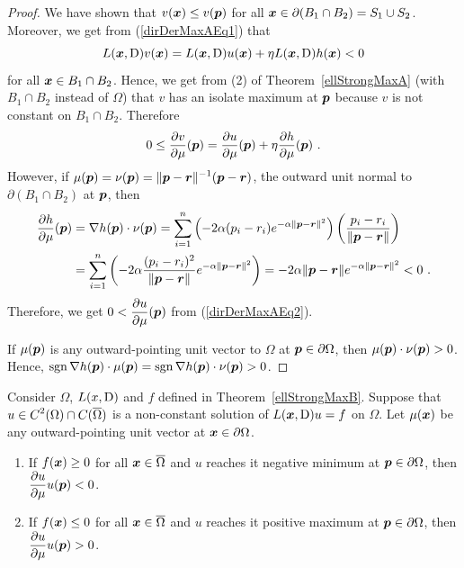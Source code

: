 \begin{proof}
We have shown that $v({\bm{x}}) \leq v({\bm{p}})$ 
for all ${\bm{x}} \in \partial (B_1 \cap B_2) = S_1 \cup S_2$.
Moreover, we get from (\ref{dirDerMaxAEq1}) that
\[
  L({\bm{x}},\operatorname{D}) v ({\bm{x}}) = L({\bm{x}},\operatorname{D}) u({\bm{x}})
  + \eta L({\bm{x}},\operatorname{D}) h({\bm{x}}) < 0
\]
for all ${\bm{x}} \in B_1 \cap B_2$.  Hence, we get
from (2) of Theorem~\ref{ellStrongMaxA} (with $B_1 \cap B_2$ instead
of $\Omega$) that $v$ has an isolate maximum at ${\bm{p}}$ because $v$
is not constant on $B_1 \cap B_2$.  Therefore
\begin{equation} \label{dirDerMaxAEq2}
0 \leq \frac{\partial{v}}{\partial \mu}({\bm{p}}) 
= \frac{\partial{u}}{\partial \mu}({\bm{p}}) + \eta \frac{\partial{h}}{\partial \mu}({\bm{p}}) \ .
\end{equation}
However, if
$\displaystyle \mu({\bm{p}}) = \nu({\bm{p}})
= \|{\bm{p}}-{\bm{r}}\|^{-1} ({\bm{p}} - {\bm{r}})$,
the outward unit normal to $\partial (B_1 \cap B_2)$ at ${\bm{p}}$, then
\begin{align*}
\frac{\partial{h}}{\partial \mu}({\bm{p}}) &= \nabla h({\bm{p}}) \cdot \nu({\bm{p}})
= \sum_{i=1}^n \left( -2 \alpha (p_i-r_i) e^{-\alpha\|{\bm{p}}-{\bm{r}}\|^2} \right)
\left( \frac{p_i- r_i}{\|{\bm{p}} - {\bm{r}}\|} \right) \\
&= \sum_{i=1}^n \left( -2 \alpha \frac{(p_i-r_i)^2}{\|{\bm{p}} - {\bm{r}}\|}
e^{-\alpha\|{\bm{p}}-{\bm{r}}\|^2} \right)
= -2 \alpha \|{\bm{p}}-{\bm{r}}\| e^{-\alpha\|{\bm{p}}-{\bm{r}}\|^2}
 < 0 \ .
\end{align*}
Therefore, we get $\displaystyle 0 < \frac{\partial{u}}{\partial \mu}({\bm{p}})$ from
(\ref{dirDerMaxAEq2}).

If $\mu({\bm{p}})$ is any outward-pointing unit vector to $\Omega$ at
${\bm{p}} \in \partial \Omega$, then $\mu({\bm{p}}) \cdot \nu({\bm{p}}) > 0$.
Hence, $\operatorname{sgn} \nabla h({\bm{p}}) \cdot \mu({\bm{p}})
= \operatorname{sgn} \nabla h({\bm{p}}) \cdot \nu({\bm{p}}) > 0$.
\end{proof}


\begin{theorem}
Consider $\Omega$, $L(x,\operatorname{D})$ and $f$ defined in Theorem~\ref{ellStrongMaxB}.
Suppose that $\displaystyle u \in C^2(\Omega) \cap C(\overline{\Omega})$ is a
non-constant solution of $L({\bm{x}},\operatorname{D}) u = f$ on $\Omega$.
Let $\mu({\bm{x}})$ be any outward-pointing unit vector at
${\bm{x}} \in \partial \Omega$. 
\begin{enumerate}
\item If $f({\bm{x}}) \geq 0$ for all ${\bm{x}} \in \overline{\Omega}$
and $u$ reaches it negative minimum at ${\bm{p}} \in \partial \Omega$,
then $\displaystyle \frac{\partial{u}}{\partial \mu} u({\bm{p}}) < 0$.
\item If $f({\bm{x}}) \leq 0$ for all ${\bm{x}} \in \overline{\Omega}$
and $u$ reaches it positive maximum at ${\bm{p}} \in \partial \Omega$,
then $\displaystyle \frac{\partial{u}}{\partial \mu} u({\bm{p}}) > 0$.
\end{enumerate}
\end{theorem}


